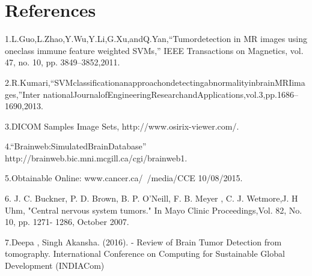 \documentclass{article}
\begin{document}
\newpage

\section{References}
\item 1.L.Guo,L.Zhao,Y.Wu,Y.Li,G.Xu,andQ.Yan,“Tumordetection in MR images using oneclass immune feature weighted
SVMs,” IEEE Transactions on Magnetics, vol. 47, no. 10, pp. 3849–3852,2011.\\
\item 2.R.Kumari,“SVMclassificationanapproachondetectingabnormalityinbrainMRIimages,”Inter
nationalJournalofEngineeringResearchandApplications,vol.3,pp.1686–1690,2013.\\
\item 3.DICOM Samples Image Sets, http://www.osirix-viewer.com/.\\
\item 4.“Brainweb:SimulatedBrainDatabase” http://brainweb.bic.mni.mcgill.ca/cgi/brainweb1.\\
\item 5.Obtainable Online: www.cancer.ca/~/media/CCE 10/08/2015.\\
\item 6. J. C. Buckner, P. D. Brown, B. P. O’Neill, F. B. Meyer , C. J. Wetmore,J. H Uhm, "Central nervous system tumors." In
Mayo Clinic Proceedings,Vol. 82, No. 10, pp. 1271- 1286, October 2007.\\
\item 7.Deepa , Singh Akansha. (2016). - Review of Brain Tumor Detection from tomography. International Conference on
Computing for Sustainable Global Development (INDIACom) 
\end{document}
